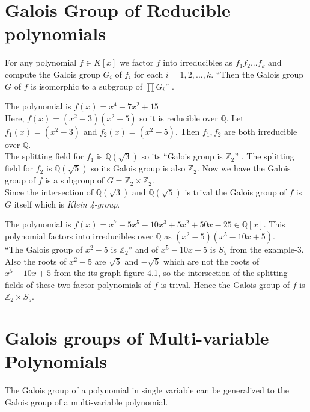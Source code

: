 \vspace{5mm}
\section{Galois Group of Reducible polynomials}
For any polynomial \(f \in K[x]\) we factor \(f\) into irreducibles as \(f_1f_2...f_k\) and compute the Galois group \(G_i\)  of \(f_i\) for each \(i=1,2,...,k\). ``Then the Galois group \(G\) of \(f\) is isomorphic to a subgroup of \(\prod G_i\)'' \cite{algorithm}.\\

\begin{example}
  The polynomial is \(f(x) = x^4-7x^2+15\)\\
  Here, \(f(x)=(x^2-3)(x^2-5)\) so it is reducible over \(\mathbb{Q}\). Let \(f_1(x)=(x^2-3)\) and \(f_2(x)=(x^2-5)\). Then \(f_1,f_2\) are both irreducible over \(\mathbb{Q}\).\\

  The splitting field for \(f_1\) is \(\mathbb{Q}(\sqrt{3})\) so its ``Galois group is \({\mathbb{Z}}_2\)'' \cite{hunger}. The splitting field for \(f_2\) is \(\mathbb{Q}(\sqrt{5})\) so its Galois group is also \({\mathbb{Z}}_2\). Now we have the Galois group of \(f\) is a subgroup of \(G={\mathbb{Z}}_2 \times {\mathbb{Z}}_2\). \\

  Since the intersection of \(\mathbb{Q}(\sqrt{3})\) and \(\mathbb{Q}(\sqrt{5})\) is trival the Galois group of \(f\) is \(G\) itself which is \textit{Klein 4-group}.
\end{example}

\begin{example}
  The polynomial is \(f(x)=x^7-5x^5-10x^3+5x^2+50x-25 \in \mathbb{Q}[x]\). This polynomial factors into irreducibles over \(\mathbb{Q}\) as \((x^2-5)(x^5-10x+5)\).\\
  ``The Galois group of \(x^2-5\) is \({\mathbb{Z}}_2\)'' \cite{algorithm} and of \(x^5-10x+5\) is \(S_5\) from the example-3. Also the roots of \(x^2-5\) are \(\sqrt{5}\) and \(-\sqrt{5}\) which are not the roots of \(x^5-10x+5\) from the its graph figure-4.1, so the intersection of the splitting fields of these two factor polynomials of \(f\) is trival. Hence the Galois group of \(f\) is \(\mathbb{Z}_2 \times S_5\).
\end{example}

\vspace{7mm}
\section{Galois groups of Multi-variable Polynomials}
The Galois group of a polynomial in single variable can be generalized to the Galois group of a multi-variable polynomial.\\

